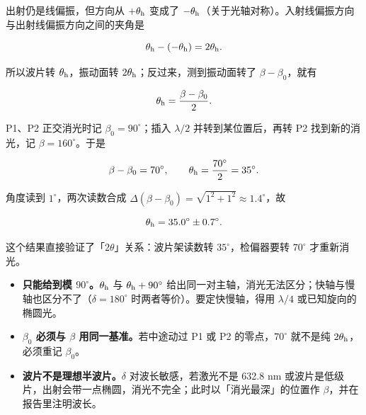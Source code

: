 \documentclass[11pt]{ctexart}
\begin{document}
出射仍是线偏振，但方向从 $+\theta_{\rm h}$ 变成了 $-\theta_{\rm h}$（关于光轴对称）。入射线偏振方向与出射线偏振方向之间的夹角是

\[
\theta_{\rm h}-(-\theta_{\rm h})=2\theta_{\rm h}.
\]

所以波片转 $\theta_{\rm h}$，振动面转 $2\theta_{\rm h}$；反过来，测到振动面转了 $\beta-\beta_0$，就有

\[
\theta_{\rm h}=\frac{\beta-\beta_0}{2}.
\]


P1、P2 正交消光时记 $\beta_0=90^\circ$；插入 $\lambda/2$ 并转到某位置后，再转 P2 找到新的消光，记 $\beta=160^\circ$。于是

\[
\beta-\beta_0=70^\circ,\qquad
\theta_{\rm h}=\frac{70^\circ}{2}=35^\circ .
\]

角度读到 $1^\circ$，两次读数合成 $\Delta(\beta-\beta_0)=\sqrt{1^2+1^2}\approx1.4^\circ$，故

\[
\theta_{\rm h}=35.0^\circ\pm0.7^\circ .
\]

这个结果直接验证了「$2\theta$」关系：波片架读数转 $35^\circ$，检偏器要转 $70^\circ$ 才重新消光。


\begin{itemize}
\item \textbf{只能给到模 $90^\circ$。}$\theta_{\rm h}$ 与 $\theta_{\rm h}+90^\circ$ 给出同一对主轴，消光无法区分；快轴与慢轴也区分不了（$\delta=180^\circ$ 时两者等价）。要定快慢轴，得用 $\lambda/4$ 或已知旋向的椭圆光。
\item \textbf{$\beta_0$ 必须与 $\beta$ 用同一基准。}若中途动过 P1 或 P2 的零点，$70^\circ$ 就不是纯 $2\theta_{\rm h}$，必须重记 $\beta_0$。
\item \textbf{波片不是理想半波片。}$\delta$ 对波长敏感，若激光不是 632.8 nm 或波片是低级片，出射会带一点椭圆，消光不完全；此时以「消光最深」的位置作 $\beta$，并在报告里注明波长。
\end{itemize}

\end{document}
